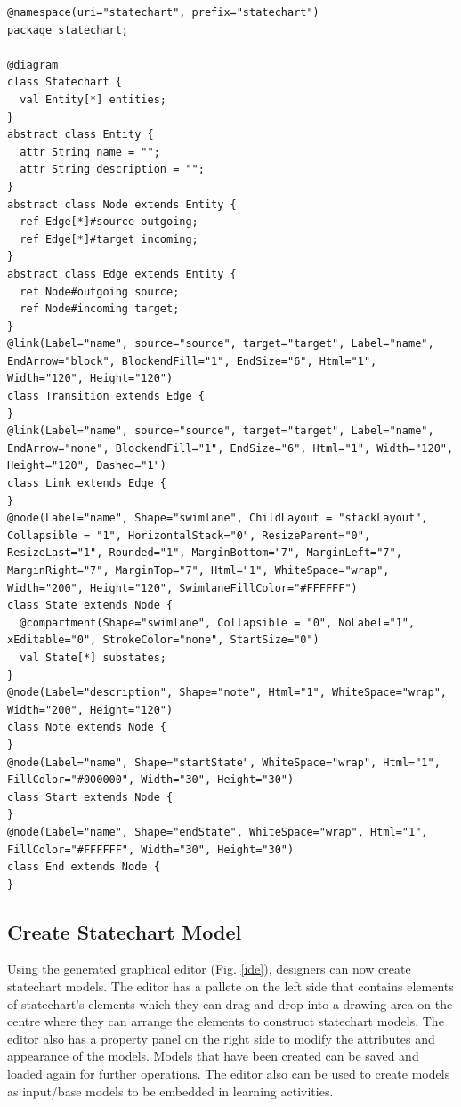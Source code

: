 \documentclass[conference]{IEEEtran}
\begin{document}
\begin{lstlisting}[style=interfaces,caption={A definition of Start State derived from Node class using Emfatic and Eugenia-like annotations.},label=metamodel]
@namespace(uri="statechart", prefix="statechart")
package statechart;

@diagram
class Statechart {
  val Entity[*] entities;
}
abstract class Entity {
  attr String name = "";
  attr String description = "";
}
abstract class Node extends Entity {
  ref Edge[*]#source outgoing;
  ref Edge[*]#target incoming;
}
abstract class Edge extends Entity {
  ref Node#outgoing source;
  ref Node#incoming target;
}
@link(Label="name", source="source", target="target", Label="name", EndArrow="block", BlockendFill="1", EndSize="6", Html="1", Width="120", Height="120")
class Transition extends Edge {
}
@link(Label="name", source="source", target="target", Label="name", EndArrow="none", BlockendFill="1", EndSize="6", Html="1", Width="120", Height="120", Dashed="1")
class Link extends Edge {
}
@node(Label="name", Shape="swimlane", ChildLayout = "stackLayout", Collapsible = "1", HorizontalStack="0", ResizeParent="0", ResizeLast="1", Rounded="1", MarginBottom="7", MarginLeft="7", MarginRight="7", MarginTop="7", Html="1", WhiteSpace="wrap", Width="200", Height="120", SwimlaneFillColor="#FFFFFF")
class State extends Node {
  @compartment(Shape="swimlane", Collapsible = "0", NoLabel="1", xEditable="0", StrokeColor="none", StartSize="0")
  val State[*] substates;
}
@node(Label="description", Shape="note", Html="1", WhiteSpace="wrap", Width="200", Height="120")
class Note extends Node {
}
@node(Label="name", Shape="startState", WhiteSpace="wrap", Html="1", FillColor="#000000", Width="30", Height="30")
class Start extends Node {
}
@node(Label="name", Shape="endState", WhiteSpace="wrap", Html="1", FillColor="#FFFFFF", Width="30", Height="30")
class End extends Node {
}
\end{lstlisting} 

\subsection{Create Statechart Model}
Using the generated graphical editor (Fig. \ref{ide}), designers can now create statechart models. The editor has a pallete on the left side that contains elements of statechart's elements which they can drag and drop into a drawing area on the centre where they can arrange the elements to construct statechart models. The editor also has a property panel on the right side to modify the attributes and appearance of the models. Models that have been created can be saved and loaded again for further operations. The editor also can be used to create models as input/base models to be embedded in learning activities.        
\end{document}
